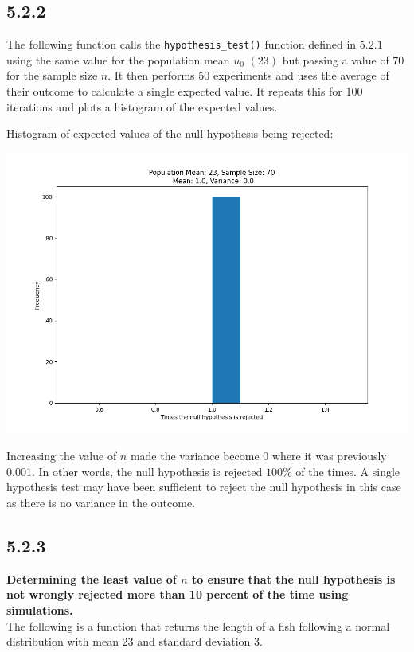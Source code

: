 \documentclass[answers]{exam}
\begin{document}
\subsection*{5.2.2}
The following function calls the \texttt{hypothesis\_test()} function defined in $5.2.1$ using the same value for the population mean $u_0$ $(23)$ but passing a value of 70 for the sample size $n$. It then performs 50 experiments and uses the average of their outcome to calculate a single expected value. It repeats this for 100 iterations and plots a histogram of the expected values.

Histogram of expected values of the null hypothesis being rejected:
\begin{center}
  \includegraphics[scale = 0.5]{Q5_histograms/Q5.2.2.png}
\end{center}
Increasing the value of $n$ made the variance become $0$ where it was previously 0.001. In other words, the null hypothesis is rejected $100\%$ of the times. A single hypothesis test may have been sufficient to reject the null hypothesis in this case as there is no variance in the outcome.

\subsection*{5.2.3}
\textbf{Determining the least value of $n$ to ensure that the null hypothesis is not wrongly rejected more than 10 percent of the time using simulations.}\\ 

The following is a function that returns the length of a fish following a normal distribution with mean 23 and standard deviation 3.

\end{document}
